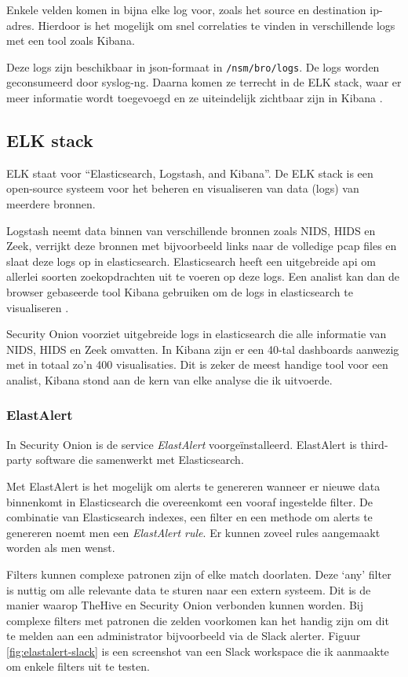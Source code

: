 \documentclass[a4paper,12pt]{report}
\begin{document}
Enkele velden komen in bijna elke log voor, zoals het source en destination ip-adres.
Hierdoor is het mogelijk om snel correlaties te vinden in verschillende logs met een tool zoals Kibana.

Deze logs zijn beschikbaar in json-formaat in \lstinline|/nsm/bro/logs|.
De logs worden geconsumeerd door syslog-ng.
Daarna komen ze terrecht in de ELK stack, waar er meer informatie wordt toegevoegd en ze uiteindelijk zichtbaar zijn in Kibana \autocite{so:docs}.

\subsection{ELK stack}
ELK staat voor ``Elasticsearch, Logstash, and Kibana''.
De ELK stack is een open-source systeem voor het beheren en visualiseren van data (logs) van meerdere bronnen.

Logstash neemt data binnen van verschillende bronnen zoals NIDS, HIDS en Zeek, verrijkt deze bronnen met bijvoorbeeld links naar de volledige pcap files en slaat deze logs op in elasticsearch.
Elasticsearch heeft een uitgebreide api om allerlei soorten zoekopdrachten uit te voeren op deze logs.
Een analist kan dan de browser gebaseerde tool Kibana gebruiken om de logs in elasticsearch te visualiseren \autocite{elastic:what-is-elk}.

Security Onion voorziet uitgebreide logs in elasticsearch die alle informatie van NIDS, HIDS en Zeek omvatten.
In Kibana zijn er een 40-tal dashboards aanwezig met in totaal zo'n 400 visualisaties.
Dit is zeker de meest handige tool voor een analist, Kibana stond aan de kern van elke analyse die ik uitvoerde.

\subsubsection{ElastAlert}
In Security Onion is de service \emph{ElastAlert} voorgeïnstalleerd.
ElastAlert is third-party software die samenwerkt met Elasticsearch.

Met ElastAlert is het mogelijk om alerts te genereren wanneer er nieuwe data binnenkomt in Elasticsearch die overeenkomt een vooraf ingestelde filter.
De combinatie van Elasticsearch indexes, een filter en een methode om alerts te genereren noemt men een \emph{ElastAlert rule}.
Er kunnen zoveel rules aangemaakt worden als men wenst.

Filters kunnen complexe patronen zijn of elke match doorlaten.
Deze `any' filter is nuttig om alle relevante data te sturen naar een extern systeem.
Dit is de manier waarop TheHive en Security Onion verbonden kunnen worden.
Bij complexe filters met patronen die zelden voorkomen kan het handig zijn om dit te melden aan een administrator bijvoorbeeld via de Slack alerter.
Figuur \ref{fig:elastalert-slack} is een screenshot van een Slack workspace die ik aanmaakte om enkele filters uit te testen.
\end{document}
